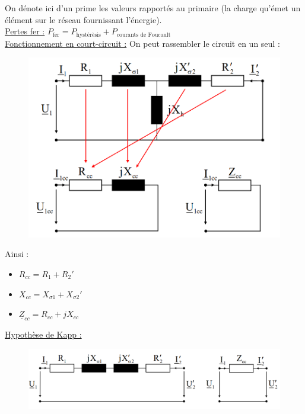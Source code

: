 \documentclass[../main.tex]{subfiles}
\begin{document}
On dénote ici d'un prime les valeurs rapportés au primaire (la charge qu'émet un élément sur le réseau fournissant l'énergie).\\

\quad \underline{Pertes fer :} $P_{\text{fer}} = P_{\text{hystérèsis}} + P_{\text{courants de Foucault}}$\\

\quad \underline{Fonctionnement en court-circuit :} On peut rassembler le circuit en un seul : 

\begin{figure}[hbt!]
    \centering
    \includegraphics[width=\textwidth]{IMAGES/machineelec/courtcircuit.png}
\end{figure}

Ainsi : \begin{itemize}
    \item $R_{cc} = R_1 + R_2'$\\
    \item $X_{cc} = X_{\sigma 1} + X_{\sigma 2}'$\\
    \item $\underline{Z}_{cc} = R_{cc} + jX_{cc}$\\
\end{itemize}

\quad \underline{Hypothèse de Kapp :}\\

\begin{figure}[hbt!]
    \centering
    \includegraphics[width=\textwidth]{IMAGES/machineelec/kapp.png}
\end{figure}
\end{document}
